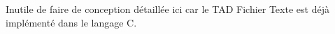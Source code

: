 Inutile de faire de conception détaillée ici car le TAD Fichier Texte est déjà implémenté dans le langage C.
